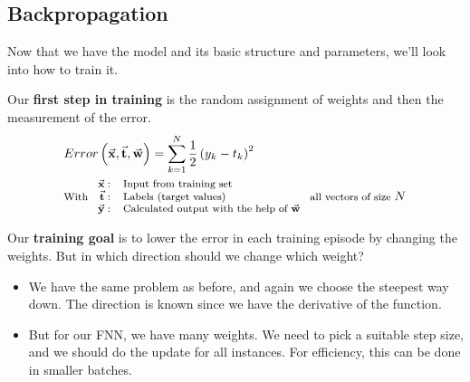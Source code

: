 \subsection{Backpropagation}
Now that we have the model and its basic structure and parameters, we'll look into how to train it.

Our \textbf{first step in training} is the random assignment of weights and then the measurement of the error.
\begin{align*}
  &Error\left(\vec{\mathbf{x}}, \vec{\mathbf{t}}, \vec{\mathbf{w}}\right) = \sum_{k=1}^N\frac{1}{2}\left(y_k - t_k\right)^2\\
  &{\footnotesize\textnormal{\color{black}{With }} \begin{array}{rl}
    \vec{\mathbf{x}}:&\textnormal{\color{black}{Input from training set}}\\
    \vec{\mathbf{t}}:&\textnormal{\color{black}{Labels (target values)}}\\
    \vec{\mathbf{y}}:&\textnormal{\color{black}{Calculated output with the help of }}\vec{\mathbf{w}}
  \end{array}\textnormal{\color{black}{ all vectors of size }}N}
\end{align*}

Our \textbf{training goal} is to lower the error in each training episode by changing the weights. But in which direction should we change which weight?
\begin{itemize}
  \item We have the same problem as before, and again we choose the steepest way down. The direction is known since we have the derivative of the function.
  \item But for our FNN, we have many weights. We need to pick a suitable step size, and we should do the update for all instances. For efficiency, this can be done in smaller batches.
\end{itemize}

